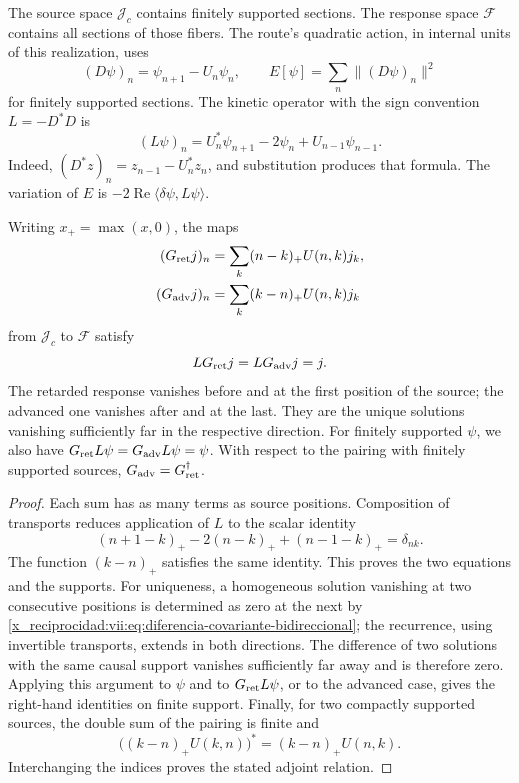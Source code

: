 The source space \(\mathcal J_c\) contains finitely supported
sections. The response space \(\mathcal F\) contains all
sections of those fibers. The route's quadratic action, in internal
units of this realization, uses
\[
 (D\psi)_n=\psi_{n+1}-U_n\psi_n,\qquad
 E[\psi]=\sum_n\|(D\psi)_n\|^2
\]
for finitely supported sections. The kinetic operator with the sign
convention \(L=-D^*D\) is
\begin{equation}
 (L\psi)_n=U_n^*\psi_{n+1}-2\psi_n+U_{n-1}\psi_{n-1}.
 \label{x_reciprocidad:vii:eq:diferencia-covariante-bidireccional}
\end{equation}
Indeed, \((D^*z)_n=z_{n-1}-U_n^*z_n\), and substitution produces
that formula. The variation of \(E\) is
\(-2\operatorname{Re}\langle\delta\psi,L\psi\rangle\).

\begin{theorem}
\label{x_reciprocidad:vii:thm:green-cronologico}
Writing \(x_+=\max(x,0)\), the maps
\begin{align}
 (G_{\rm ret}j)_n&=\sum_k(n-k)_+U(n,k)j_k,\label{x_reciprocidad:vii:eq:green-ret-cronologico}\\
 (G_{\rm adv}j)_n&=\sum_k(k-n)_+U(n,k)j_k\label{x_reciprocidad:vii:eq:green-adv-cronologico}
\end{align}
from \(\mathcal J_c\) to \(\mathcal F\) satisfy
\[
 LG_{\rm ret}j=LG_{\rm adv}j=j.
\]
The retarded response vanishes before and at the first position of the
source; the advanced one vanishes after and at the last. They are the unique
solutions vanishing sufficiently far in the respective direction.
For finitely supported \(\psi\), we also have
\(G_{\rm ret}L\psi=G_{\rm adv}L\psi=\psi\).
With respect to the pairing with finitely supported sources,
\(G_{\rm adv}=G_{\rm ret}^{\dagger}\).
\end{theorem}
\begin{proof}
Each sum has as many terms as source positions.
Composition of transports reduces application of \(L\) to
the scalar identity
\[
 (n+1-k)_+-2(n-k)_++(n-1-k)_+=\delta_{nk}.
\]
The function \((k-n)_+\) satisfies the same identity. This proves
the two equations and the supports. For uniqueness, a homogeneous
solution vanishing at two consecutive positions is determined
as zero at the next by \eqref{x_reciprocidad:vii:eq:diferencia-covariante-bidireccional};
the recurrence, using invertible transports, extends in both
directions. The difference of two solutions with the same causal support
vanishes sufficiently far away and is therefore zero.
Applying this argument to \(\psi\) and to \(G_{\rm ret}L\psi\), or to the
advanced case, gives the right-hand identities on finite support.
Finally, for two compactly supported sources, the double sum of the pairing
is finite and
\[
 \bigl((k-n)_+U(k,n)\bigr)^*=(k-n)_+U(n,k).
\]
Interchanging the indices proves the stated adjoint relation.
\end{proof}

